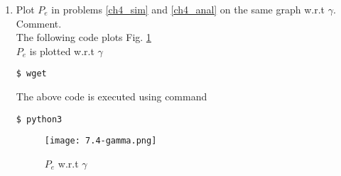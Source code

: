 \documentclass[journal,12pt,twocolumn]{IEEEtran}
\renewcommand\thesection{\arabic{section}}
\begin{document}
\begin{enumerate}[label=\thesection.\arabic*
,ref=\thesection.\theenumi]
\item
Plot $P_e$ in problems \ref{ch4_sim} and \ref{ch4_anal} on the same graph w.r.t $\gamma$.  Comment.\\
\solution  The following code plots Fig. \ref{fig:7.4-gamma}\\
$P_e$ is plotted w.r.t $\gamma$
\begin{lstlisting}
$ wget
\end{lstlisting}
The above code is executed using command
\begin{lstlisting}
$ python3 
\end{lstlisting}
\begin{figure}[h]
    \centering
    \texttt{[image: 7.4-gamma.png]}
    \caption{$P_e$ w.r.t $\gamma$}
    \label{fig:7.4-gamma}
\end{figure}


\end{enumerate}
\end{document}
